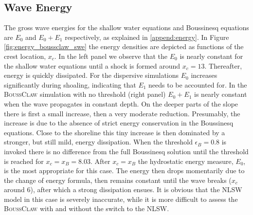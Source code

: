 \documentclass[review]{elsarticle}
\newcommand{\BoussClaw}{\textsc{BoussClaw} }
\begin{document}
\subsection{Wave Energy}
\label{sec:wave_energy}
The gross wave energies  
for the shallow water equations and Boussinesq equations
are $E_0$ and $E_0+E_1$  respectively, as explained in \ref{append:energy}. 
In Figure \ref{fig:energy_boussclaw_swe} the energy densities are depicted as 
functions of the crest location, $x_c$. 
In the left panel 
we observe that the $E_0$ is nearly constant 
for the shallow water equations until a shock is formed around $x_c=13$.
Thereafter, energy is quickly dissipated. For the dispersive simulations $E_0$
increases significantly during shoaling, indicating that $E_1$ needs to be accounted for.
In  the \BoussClaw simulation with no threshold (right panel) 
$E_0+E_1$ is nearly constant when the wave propagates in constant depth. 
On the deeper parts of the slope there is first a small increase, then a
very moderate reduction. Presumably, the increase is  due to the absence of strict energy  conservation in the Boussinesq equations. 
Close to the shoreline this tiny increase is then dominated by a stronger, but still mild, energy dissipation.
When the threshold $\epsilon_B=0.8$ is invoked there is no difference from the full Boussinesq solution until the threshold is reached for  $x_c=x_B=8.03$. 
After  $x_c=x_B$  
the hydrostatic energy measure, $E_0$, is the most appropriate for this case.
The energy then drops momentarily due to the change of energy formula, then remains constant until the wave breaks ($x_c$ around 6), after which a strong dissipation ensues. 
It is obvious that the NLSW model in this case is severely inaccurate, while 
it is more difficult to assess the \BoussClaw 
with and without the switch to the NLSW.
\end{document}
